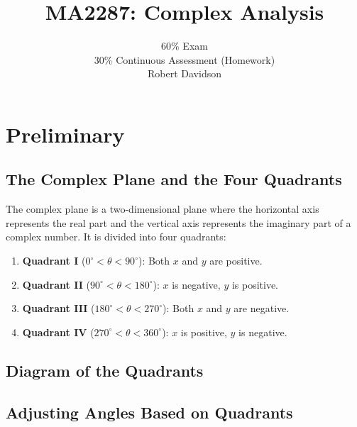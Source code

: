 \documentclass[a4paper, 10pt]{article}
\title{
\textbf{MA2287: Complex Analysis} \\ 
}
\author{
  60\% Exam\\
  30\% Continuous Assessment (Homework) \\
  Robert Davidson
}
\date{} %
\begin{document}
\maketitle
\pagebreak
\tableofcontents
\pagebreak


\section{Preliminary}
\subsection{The Complex Plane and the Four Quadrants}

The complex plane is a two-dimensional plane where the horizontal axis represents the real part and the vertical axis represents the imaginary part of a complex number. It is divided into four quadrants:

\begin{enumerate}
  \item \textbf{Quadrant I} ($0^\circ < \theta < 90^\circ$): Both $x$ and $y$ are positive.
  \item \textbf{Quadrant II} ($90^\circ < \theta < 180^\circ$): $x$ is negative, $y$ is positive.
  \item \textbf{Quadrant III} ($180^\circ < \theta < 270^\circ$): Both $x$ and $y$ are negative.
  \item \textbf{Quadrant IV} ($270^\circ < \theta < 360^\circ$): $x$ is positive, $y$ is negative.
\end{enumerate}

\hfill

\subsection{Diagram of the Quadrants}
\hfill \hfill
\begin{center}
\end{center}


\subsection{Adjusting Angles Based on Quadrants}
\end{document}
